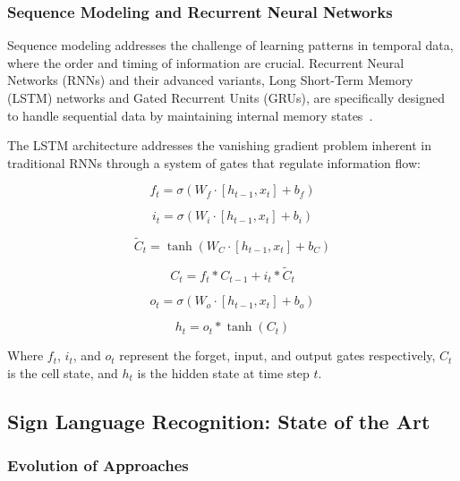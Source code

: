 \documentclass[11pt, a4paper]{article}
\begin{document}
\subsubsection{Sequence Modeling and Recurrent Neural Networks}

Sequence modeling addresses the challenge of learning patterns in temporal data, where the order and timing of information are crucial. Recurrent Neural Networks (RNNs) and their advanced variants, Long Short-Term Memory (LSTM) networks and Gated Recurrent Units (GRUs), are specifically designed to handle sequential data by maintaining internal memory states~\cite{Hochreiter97}.

The LSTM architecture addresses the vanishing gradient problem inherent in traditional RNNs through a system of gates that regulate information flow:

\begin{equation}
f_t = \sigma(W_f \cdot [h_{t-1}, x_t] + b_f)
\end{equation}

\begin{equation}
i_t = \sigma(W_i \cdot [h_{t-1}, x_t] + b_i)
\end{equation}

\begin{equation}
\tilde{C}_t = \tanh(W_C \cdot [h_{t-1}, x_t] + b_C)
\end{equation}

\begin{equation}
C_t = f_t * C_{t-1} + i_t * \tilde{C}_t
\end{equation}

\begin{equation}
o_t = \sigma(W_o \cdot [h_{t-1}, x_t] + b_o)
\end{equation}

\begin{equation}
h_t = o_t * \tanh(C_t)
\end{equation}

Where $f_t$, $i_t$, and $o_t$ represent the forget, input, and output gates respectively, $C_t$ is the cell state, and $h_t$ is the hidden state at time step $t$.

\subsection{Sign Language Recognition: State of the Art}

\subsubsection{Evolution of Approaches}
\end{document}
